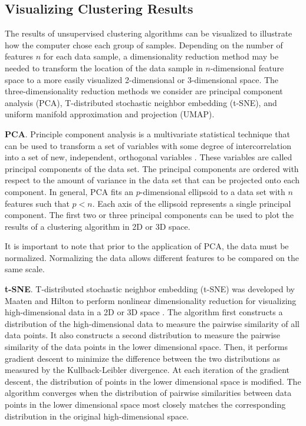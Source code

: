 \subsection{Visualizing Clustering Results} 

The results of unsupervised clustering algorithms can be visualized to illustrate how the computer chose each group of samples. Depending on the number of features $n$ for each data sample, a dimensionality reduction method may be needed to transform the location of the data sample in $n$-dimensional feature space to a more easily visualized 2-dimensional or 3-dimensional space. The three-dimensionality reduction methods we consider are principal component analysis (PCA), T-distributed stochastic neighbor embedding (t-SNE), and uniform manifold approximation and projection (UMAP).

\textbf{PCA}. Principle component analysis is a multivariate statistical technique that can be used to transform a set of variables with some degree of intercorrelation into a set of new, independent, orthogonal variables \cite{Abdi2010}. These variables are called principal components of the data set. The principal components are ordered with respect to the amount of variance in the data set that can be projected onto each component. In general, PCA fits an $p$-dimensional ellipsoid to a data set with $n$ features such that $p < n$. Each axis of the ellipsoid represents a single principal component. The first two or three principal components can be used to plot the results of a clustering algorithm in 2D or 3D space.

It is important to note that prior to the application of PCA, the data must be normalized. Normalizing the data allows different features to be compared on the same scale.

\textbf{t-SNE}. T-distributed stochastic neighbor embedding (t-SNE) was developed by Maaten and Hilton to perform nonlinear dimensionality reduction for visualizing high-dimensional data in a 2D or 3D space \cite{Maaten2008}. The algorithm first constructs a distribution of the high-dimensional data to measure the pairwise similarity of all data points. It also constructs a second distribution to measure the pairwise similarity of the data points in the lower dimensional space. Then, it performs gradient descent to minimize the difference between the two distributions as measured by the Kullback-Leibler divergence. At each iteration of the gradient descent, the distribution of points in the lower dimensional space is modified. The algorithm converges when the distribution of pairwise similarities between data points in the lower dimensional space most closely matches the corresponding distribution in the original high-dimensional space.

